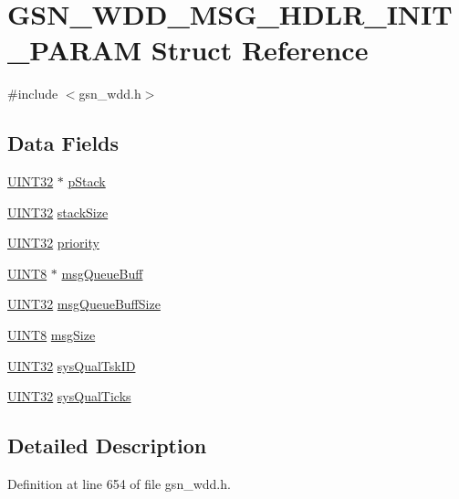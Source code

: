 \hypertarget{a00280}{
\section{GSN\_\-WDD\_\-MSG\_\-HDLR\_\-INIT\_\-PARAM Struct Reference}
\label{a00280}
}


{\ttfamily \#include $<$gsn\_\-wdd.h$>$}

\subsection*{Data Fields}
\begin{DoxyCompactItemize}
\item 
\hyperlink{a00660_gae1e6edbbc26d6fbc71a90190d0266018}{UINT32} $\ast$ \hyperlink{a00280_a06dc12db7ec3c52d8dc551e9e8f77e63}{pStack}
\item 
\hyperlink{a00660_gae1e6edbbc26d6fbc71a90190d0266018}{UINT32} \hyperlink{a00280_a82cabdcaee43fc729a1da5551d429f73}{stackSize}
\item 
\hyperlink{a00660_gae1e6edbbc26d6fbc71a90190d0266018}{UINT32} \hyperlink{a00280_a4eb2b736accd00141e11004adc0fded0}{priority}
\item 
\hyperlink{a00660_gab27e9918b538ce9d8ca692479b375b6a}{UINT8} $\ast$ \hyperlink{a00280_a7e51f5f5131592004e739bcc100a27fc}{msgQueueBuff}
\item 
\hyperlink{a00660_gae1e6edbbc26d6fbc71a90190d0266018}{UINT32} \hyperlink{a00280_a21640f5a1df0caa651f4ffe4280d6210}{msgQueueBuffSize}
\item 
\hyperlink{a00660_gab27e9918b538ce9d8ca692479b375b6a}{UINT8} \hyperlink{a00280_aafd0a2e6e8c7d8ff4ee52626581abe6f}{msgSize}
\item 
\hyperlink{a00660_gae1e6edbbc26d6fbc71a90190d0266018}{UINT32} \hyperlink{a00280_a3e06cb8fa58f49b7004a85c6f387ddc7}{sysQualTskID}
\item 
\hyperlink{a00660_gae1e6edbbc26d6fbc71a90190d0266018}{UINT32} \hyperlink{a00280_a3b8eb219c70a5f7fc6dcb9d9643cbc31}{sysQualTicks}
\end{DoxyCompactItemize}


\subsection{Detailed Description}


Definition at line 654 of file gsn\_\-wdd.h.



